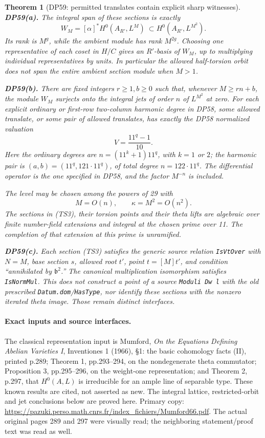 \documentclass[11pt,a4paper]{article}
\newtheorem{theorem}{Theorem}[section]
\theoremstyle{definition}\newtheorem{remark}[theorem]{Remark}
\begin{document}
\begin{theorem}[DP59: permitted translates contain explicit sharp witnesses]
\textbf{DP59(a).} The integral span of these sections is exactly \[
 W_M=[\alpha]^*H^0(A_{R'},L^M)
       \ \subset H^0(A_{R'},L^{M^2}).
 \tag{TS4}
\] Its rank is \(M^g\), while the ambient module has rank \(M^{2g}\). Choosing one representative of each coset in \(H/C\) gives an \(R'\)-basis of \(W_M\), up to multiplying individual representatives by units. In particular the allowed half-torsion orbit does not span the entire ambient section module when \(M>1\).

\textbf{DP59(b).} There are fixed integers \(r\ge1,b\ge0\) such that, whenever \(M\ge rn+b\), the module \(W_M\) surjects onto the integral jets of order \(n\) of \(L^{M^2}\) at zero. For each explicit ordinary or first-row two-column harmonic degree in DP58, some allowed translate, or some pair of allowed translates, has exactly the DP58 normalized valuation \[
 V=\frac{11^q-1}{10}.
 \tag{TS5}
\] Here the ordinary degrees are \(n=(11^k+1)11^q\), with \(k=1\) or \(2\); the harmonic pair is \((a,b)=(11^q,121\cdot11^q)\), of total degree \(n=122\cdot11^q\). The differential operator is the one specified in DP58, and the factor \(M^{-n}\) is included.

The level may be chosen among the powers of 29 with \[
 M=O(n),\qquad \kappa=M^2=O(n^2).
 \tag{TS6}
\] The sections in (TS3), their torsion points and their theta lifts are algebraic over finite number-field extensions and integral at the chosen prime over 11. The completion of that extension at this prime is unramified.

\textbf{DP59(c).} Each section (TS3) satisfies the generic source relation \texttt{IsVtOver} with \(N=M\), base section \(s\), allowed root \(t'\), point \(t=[M]t'\), and condition ``annihilated by \(\mathfrak b^2\).'' The canonical multiplication isomorphism satisfies \texttt{IsNormMul}. This does not construct a point of a source \texttt{Moduli\ Dw\ l} with the old prescribed \texttt{Datum.dom}/\texttt{HasType}, nor identify these sections with the nonzero iterated theta image. Those remain distinct interfaces.
\end{theorem}

\paragraph{Exact inputs and source interfaces.}
The classical representation input is Mumford, \emph{On the Equations Defining Abelian Varieties I}, Inventiones 1 (1966), §1: the basic cohomology facts (II), printed p.289; Theorem 1, pp.293--294, on the nondegenerate theta commutator; Proposition 3, pp.295--296, on the weight-one representation; and Theorem 2, p.297, that \(H^0(A,L)\) is irreducible for an ample line of separable type. These known results are cited, not asserted as new. The integral lattice, restricted-orbit and jet conclusions below are proved here. Primary copy: \url{https://pazuki.perso.math.cnrs.fr/index_fichiers/Mumford66.pdf}. The actual original pages 289 and 297 were visually read; the neighboring statement/proof text was read as well.
\end{document}
